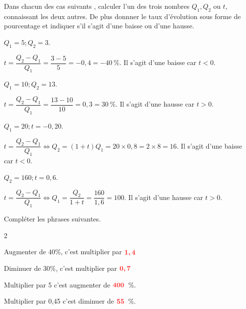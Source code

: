 \documentclass[11pt,a4paper]{article}  %
\begin{document}
Dans chacun des cas suivants , calculer l'un des trois nombres $Q_{1}, Q_{2}$ ou $t$, connaissant les deux autres. De plus donnner le taux d'évolution sous forme de pourcentage et indiquer s'il s'agit d'une baisse ou d'une hausse.
		\begin{enumMet}
		\item $Q_{1}=5 ; Q_{2}=3$.
		\begin{corrBox}
			$t=\dfrac{Q_2-Q_1}{Q_1}=\dfrac{3-5}{5}=-0,4=-40\ \%$. Il s'agit d'une baisse car $t<0$.
		\end{corrBox}
		\item $Q_{1}=10 ; Q_{2}=13$.
		\begin{corrBox}
			$t=\dfrac{Q_2-Q_1}{Q_1}=\dfrac{13-10}{10}=0,3=30\ \%$. Il s'agit d'une hausse car $t>0$.
		\end{corrBox}
		\item $Q_{1}=20 ; t=-0,20$.
		\begin{corrBox}
			$t=\dfrac{Q_2-Q_1}{Q_1} \iff Q_2=(1+t)Q_1=20\times 0,8=2\times 8=16$. Il s'agit d'une baisse car $t<0$.
		\end{corrBox}
		\item $Q_{2}=160 ; t=0,6$.
		\begin{corrBox}
			$t=\dfrac{Q_2-Q_1}{Q_1} \iff Q_1=\dfrac{Q_2}{1+t}=\dfrac{160}{1,6}=100$. Il s'agit d'une hausse car $t>0$.
		\end{corrBox}
	\end{enumMet}


Compléter les phrases suivantes.
\begin{multicols}{2}
	\begin{enumMet}
	\item Augmenter de $40 \%$, c'est multiplier par $\mRouge{1,4}$
	\item Diminuer de $30 \%$, c'est multiplier par $\mRouge{0,7}$
	\item Multiplier par 5 c'est augmenter de $\mRouge{400}$\ \%.
	\item Multiplier par 0,45 c'est diminuer de $\mRouge{55}$\ \%.	
\end{enumMet}
\end{multicols}

\end{document}
